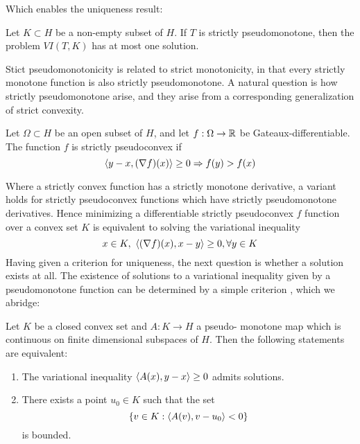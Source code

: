Which enables the uniqueness result:
\begin{theorem}
  \label{thm:uniqueness}
  Let $K\subset H$ be a non-empty subset of $H$. If $T$ is strictly pseudomonotone, then the problem $VI(T,K)$ has at most one solution.
\end{theorem}
Stict pseudomonotonicity is related to strict monotonicity, in that every strictly monotone function is also strictly pseudomonotone. A natural question is how strictly pseudomonotone arise, and they arise from a corresponding generalization of strict convexity.
\begin{definition}
  Let $\Omega \subset H$ be an open subset of $H$, and let $f:\Omega \to \mathbb{R}$ be Gateaux-differentiable. The function $f$ is strictly pseudoconvex if
  \begin{equation}
    \left \langle y-x,(\nabla f)(x) \right \rangle \geq 0 \Rightarrow f(y) > f(x)
  \end{equation}
\end{definition}
Where a strictly convex function has a strictly monotone derivative, a variant holds for strictly pseudoconvex functions which have strictly pseudomonotone derivatives.
Hence minimizing a differentiable strictly pseudoconvex $f$ function over a convex set $K$ is equivalent to solving the variational inequality \citep[P. 521]{hadjisavvas2006handbook}
\begin{equation}
  \label{eq:min_func}
  x \in K, ~ \left \langle (\nabla f)(x),x-y \right \rangle \geq 0, \forall y\in K
\end{equation}
Having given a criterion for uniqueness, the next question is whether a solution exists at all. The existence of solutions to a variational inequality given by a pseudomonotone function can be determined by a simple criterion \citep[Theorem 3.4]{maugeri2009existence}, which we abridge:
\begin{theorem}
  \label{thm:existence}
  Let $K$ be a closed convex set and $A : K \to H$  a pseudo-
  monotone map which is continuous on finite dimensional subspaces of $H$. Then the following statements are equivalent:
\end{theorem}
\begin{enumerate}
  \item The variational inequality $\left \langle A(x),y-x \right \rangle \geq 0$ admits solutions.
  \item There exists a point $u_0 \in K$ such that the set
  \begin{equation}
    \{v \in K : \left \langle A(v),v-u_0 \right \rangle < 0\}
  \end{equation}
  is bounded.
\end{enumerate}
